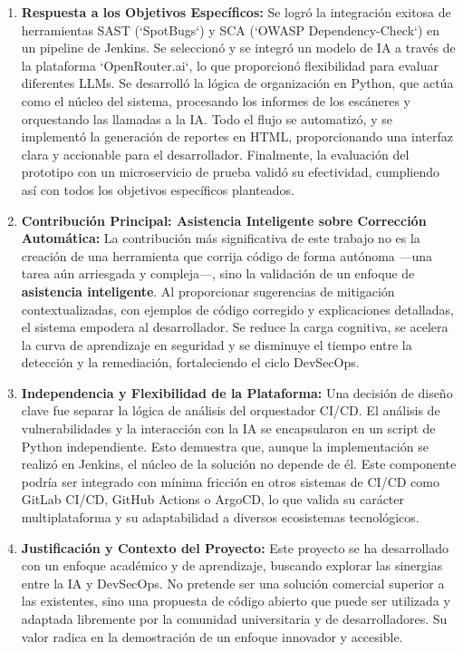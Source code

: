 \begin{enumerate}
    \item \textbf{Respuesta a los Objetivos Específicos:} Se logró la integración exitosa de herramientas SAST (`SpotBugs`) y SCA (`OWASP Dependency-Check`) en un pipeline de Jenkins. Se seleccionó y se integró un modelo de IA a través de la plataforma `OpenRouter.ai`, lo que proporcionó flexibilidad para evaluar diferentes LLMs. Se desarrolló la lógica de organización en Python, que actúa como el núcleo del sistema, procesando los informes de los escáneres y orquestando las llamadas a la IA. Todo el flujo se automatizó, y se implementó la generación de reportes en HTML, proporcionando una interfaz clara y accionable para el desarrollador. Finalmente, la evaluación del prototipo con un microservicio de prueba validó su efectividad, cumpliendo así con todos los objetivos específicos planteados.

    \item \textbf{Contribución Principal: Asistencia Inteligente sobre Corrección Automática:} La contribución más significativa de este trabajo no es la creación de una herramienta que corrija código de forma autónoma ---una tarea aún arriesgada y compleja---, sino la validación de un enfoque de \textbf{asistencia inteligente}. Al proporcionar sugerencias de mitigación contextualizadas, con ejemplos de código corregido y explicaciones detalladas, el sistema empodera al desarrollador. Se reduce la carga cognitiva, se acelera la curva de aprendizaje en seguridad y se disminuye el tiempo entre la detección y la remediación, fortaleciendo el ciclo DevSecOps.

    \item \textbf{Independencia y Flexibilidad de la Plataforma:} Una decisión de diseño clave fue separar la lógica de análisis del orquestador CI/CD. El análisis de vulnerabilidades y la interacción con la IA se encapsularon en un script de Python independiente. Esto demuestra que, aunque la implementación se realizó en Jenkins, el núcleo de la solución no depende de él. Este componente podría ser integrado con mínima fricción en otros sistemas de CI/CD como GitLab CI/CD, GitHub Actions o ArgoCD, lo que valida su carácter multiplataforma y su adaptabilidad a diversos ecosistemas tecnológicos.

    \item \textbf{Justificación y Contexto del Proyecto:} Este proyecto se ha desarrollado con un enfoque académico y de aprendizaje, buscando explorar las sinergias entre la IA y DevSecOps. No pretende ser una solución comercial superior a las existentes, sino una propuesta de código abierto que puede ser utilizada y adaptada libremente por la comunidad universitaria y de desarrolladores. Su valor radica en la demostración de un enfoque innovador y accesible.
\end{enumerate}

